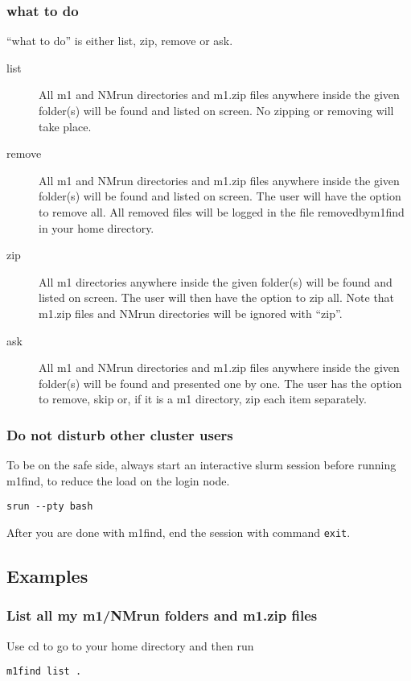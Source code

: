 \documentclass[a4wide,12pt]{article}
\renewcommand{\_}{\textscale{.7}{\textunderscore}}
\begin{document}
\subsubsection*{what to do}
``what to do'' is either list, zip, remove or ask.
\begin{description}
\item[list] All m1 and NM\_run directories and m1.zip files anywhere inside the given folder(s) will be found
  and listed on screen. No zipping or removing will take place. 
\item[remove] All m1 and NM\_run directories and m1.zip files anywhere inside the given folder(s) will be found and listed on screen.
         The user will have the option to remove all.
         All removed files will be logged in the file removed\_by\_m1find in your home directory.
\item[zip] All m1 directories anywhere inside the given folder(s) will be found and listed on screen.
  The user will then have the option to zip all. Note that m1.zip files and NM\_run directories
  will be ignored with ``zip''.
\item[ask] All m1 and NM\_run directories and m1.zip files anywhere inside the given folder(s)
  will be found and presented one by one.
  The user has the option to remove, skip or, if it is a m1 directory, zip each item separately.
\end{description}

\subsubsection*{Do not disturb other cluster users}
To be on the safe side, always
start an interactive slurm session before running m1find,
to reduce the load on the login node.
\begin{verbatim}
srun --pty bash
\end{verbatim}

\noindent After you are done with m1find, end the session with command \verb|exit|.

\subsection{Examples}

\subsubsection*{List all my m1/NM\_run folders and m1.zip files}
Use cd to go to your home directory and then run
\begin{verbatim}
m1find list .
\end{verbatim}
\end{document}
